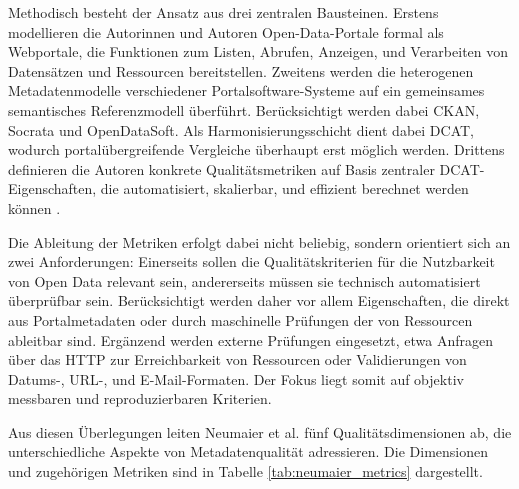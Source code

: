 Methodisch besteht der Ansatz aus drei zentralen Bausteinen.
Erstens modellieren die Autorinnen und Autoren Open-Data-Portale formal als Webportale, die Funktionen zum Listen, Abrufen, Anzeigen, und Verarbeiten von Datensätzen und Ressourcen bereitstellen.
Zweitens werden die heterogenen Metadatenmodelle verschiedener Portalsoftware-Systeme auf ein gemeinsames semantisches Referenzmodell überführt.
Berücksichtigt werden dabei \acrfull{CKAN}, Socrata und OpenDataSoft.
Als Harmonisierungsschicht dient dabei DCAT, wodurch portalübergreifende Vergleiche überhaupt erst möglich werden. 
Drittens definieren die Autoren konkrete Qualitätsmetriken auf Basis zentraler DCAT-Eigenschaften, die automatisiert, skalierbar, und effizient berechnet werden können \cite{Neumaier2016MetadataQuality}.

Die Ableitung der Metriken erfolgt dabei nicht beliebig, sondern orientiert sich an zwei Anforderungen: Einerseits sollen die Qualitätskriterien für die Nutzbarkeit von Open Data relevant sein, andererseits müssen sie technisch automatisiert überprüfbar sein. Berücksichtigt werden daher vor allem Eigenschaften, die direkt aus Portalmetadaten oder durch maschinelle Prüfungen der  von Ressourcen ableitbar sind.
Ergänzend werden externe Prüfungen eingesetzt, etwa Anfragen über das \acrfull{HTTP} zur Erreichbarkeit von Ressourcen oder Validierungen von Datums-, URL-, und E-Mail-Formaten. Der Fokus liegt somit auf objektiv messbaren und reproduzierbaren Kriterien.

Aus diesen Überlegungen leiten Neumaier et al. fünf Qualitätsdimensionen ab, die unterschiedliche Aspekte von Metadatenqualität adressieren.
Die Dimensionen und zugehörigen Metriken sind in Tabelle \ref{tab:neumaier_metrics} dargestellt.


